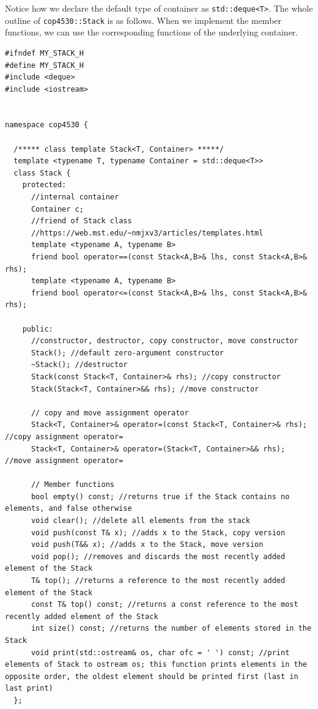 \documentclass[11pt]{book}
\begin{document}
Notice how we declare the default type of container as \texttt{std::deque<T>}. The whole outline of \texttt{cop4530::Stack} is as follows. When we implement the member functions, we can use the corresponding functions of the underlying container. 
\begin{verbatim}
#ifndef MY_STACK_H
#define MY_STACK_H
#include <deque>
#include <iostream>


namespace cop4530 {

  /***** class template Stack<T, Container> *****/
  template <typename T, typename Container = std::deque<T>>
  class Stack {
    protected:
      //internal container
      Container c;
      //friend of Stack class
      //https://web.mst.edu/~nmjxv3/articles/templates.html
      template <typename A, typename B>
      friend bool operator==(const Stack<A,B>& lhs, const Stack<A,B>& rhs);      
      template <typename A, typename B>
      friend bool operator<=(const Stack<A,B>& lhs, const Stack<A,B>& rhs);

    public:
      //constructor, destructor, copy constructor, move constructor
      Stack(); //default zero-argument constructor
      ~Stack(); //destructor
      Stack(const Stack<T, Container>& rhs); //copy constructor
      Stack(Stack<T, Container>&& rhs); //move constructor

      // copy and move assignment operator
      Stack<T, Container>& operator=(const Stack<T, Container>& rhs); //copy assignment operator=
      Stack<T, Container>& operator=(Stack<T, Container>&& rhs); //move assignment operator=

      // Member functions
      bool empty() const; //returns true if the Stack contains no elements, and false otherwise
      void clear(); //delete all elements from the stack
      void push(const T& x); //adds x to the Stack, copy version
      void push(T&& x); //adds x to the Stack, move version 
      void pop(); //removes and discards the most recently added element of the Stack 
      T& top(); //returns a reference to the most recently added element of the Stack 
      const T& top() const; //returns a const reference to the most recently added element of the Stack
      int size() const; //returns the number of elements stored in the Stack
      void print(std::ostream& os, char ofc = ' ') const; //print elements of Stack to ostream os; this function prints elements in the opposite order, the oldest element should be printed first (last in last print)            
  };


\end{verbatim}
\end{document}
